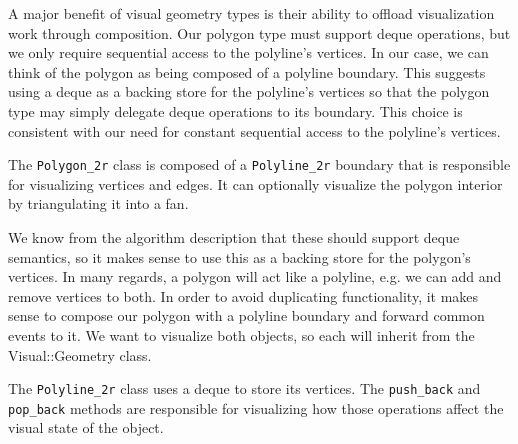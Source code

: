 A major benefit of visual geometry types is their ability to offload
visualization work through composition. Our polygon type must support deque
operations, but we only require sequential access to the polyline's vertices. In
our case, we can think of the polygon as being composed of a polyline boundary.
This suggests using a deque as a backing store for the polyline's vertices so
that the polygon type may simply delegate deque operations to its boundary. This
choice is consistent with our need for constant sequential access to the
polyline's vertices.



The \texttt{Polygon\_2r} class is composed of a \texttt{Polyline\_2r} boundary
that is responsible for visualizing vertices and edges. It can optionally
visualize the polygon interior by triangulating it into a fan.

 We know from the algorithm description that these should support deque
semantics, so it makes sense to use this as a backing store for the polygon's
vertices. In many regards, a polygon will act like a polyline, e.g. we can add
and remove vertices to both. In order to avoid duplicating functionality, it
makes sense to compose our polygon with a polyline boundary and forward common
events to it. We want to visualize both objects, so each will inherit from the
Visual::Geometry class.

The \texttt{Polyline\_2r} class uses a deque to store its vertices. The
\texttt{push\_back} and \texttt{pop\_back} methods are responsible for
visualizing how those operations affect the visual state of the object.